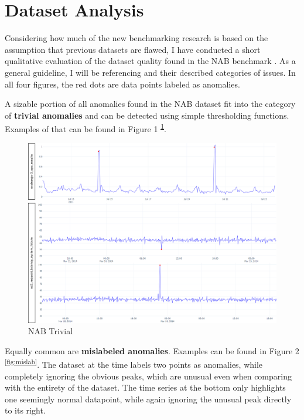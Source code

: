 \documentclass[12pt,oneside]{article}
\newcommand{\supref}[1]{\textsuperscript{\footnotesize{\ref{#1}}}}
\begin{document}
\section{Dataset Analysis}

Considering how much of the new benchmarking research is based on the assumption that previous datasets are flawed, I have conducted a short qualitative evaluation of the dataset quality found in the NAB benchmark \parencite{Lavin_2015}. As a general guideline, I will be referencing \cite{wu2021current} and their described categories of issues. In all four figures, the red dots are data points labeled as anomalies. 


A sizable portion of all anomalies found in the NAB dataset fit into the category of \textbf{trivial anomalies} and can be detected using simple thresholding functions. Examples of that can be found in Figure 1 \supref{fig:trivial}. \par

\begin{figure}[htbp] 
    \centering 
    \includegraphics[width=\textwidth]{trivial.png}
    \caption{NAB Trivial}
    \label{fig:trivial}
\end{figure}


Equally common are \textbf{mislabeled anomalies}. Examples can be found in Figure 2 \supref{fig:mislab}. The dataset at the time labels two points as anomalies, while completely ignoring the obvious peaks, which are unusual even when comparing with the entirety of the dataset. The time series at the bottom only highlights one seemingly normal datapoint, while again ignoring the unusual peak directly to its right.
\end{document}
